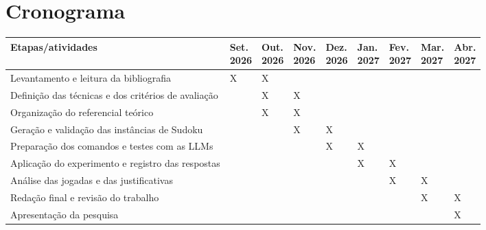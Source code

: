 \chapter{Cronograma}

\begin{center}
\small
\setlength{\tabcolsep}{2pt}
\renewcommand{\arraystretch}{1.35}
\begin{tabular}{|p{5.5cm}|*{8}{>{\centering\arraybackslash}p{1.05cm}|}}
\hline
\textbf{Etapas/atividades} & \shortstack{\textbf{Set.}\\\textbf{2026}} & \shortstack{\textbf{Out.}\\\textbf{2026}} & \shortstack{\textbf{Nov.}\\\textbf{2026}} & \shortstack{\textbf{Dez.}\\\textbf{2026}} & \shortstack{\textbf{Jan.}\\\textbf{2027}} & \shortstack{\textbf{Fev.}\\\textbf{2027}} & \shortstack{\textbf{Mar.}\\\textbf{2027}} & \shortstack{\textbf{Abr.}\\\textbf{2027}} \\
\hline
Levantamento e leitura da bibliografia & X & X & & & & & & \\
\hline
Definição das técnicas e dos critérios de avaliação & & X & X & & & & & \\
\hline
Organização do referencial teórico & & X & X & & & & & \\
\hline
Geração e validação das instâncias de Sudoku & & & X & X & & & & \\
\hline
Preparação dos comandos e testes com as LLMs & & & & X & X & & & \\
\hline
Aplicação do experimento e registro das respostas & & & & & X & X & & \\
\hline
Análise das jogadas e das justificativas & & & & & & X & X & \\
\hline
Redação final e revisão do trabalho & & & & & & & X & X \\
\hline
Apresentação da pesquisa & & & & & & & & X \\
\hline
\end{tabular}
\end{center}
